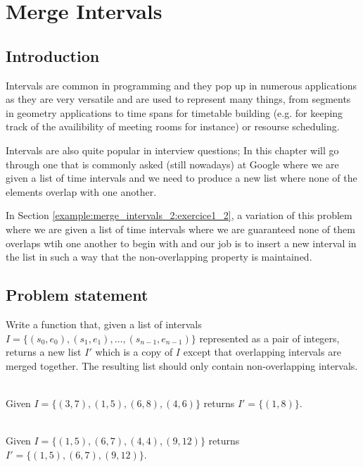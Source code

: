 %



\chapter{Merge Intervals}
\label{ch:merge_intervals_2}
\section*{Introduction}
Intervals are common in programming and they pop up in numerous applications as they are very versatile and are used to represent many things, from segments in geometry applications to time spans for timetable building (e.g. for keeping track of the availibility of meeting rooms for instance) or resourse scheduling.

Intervals are also quite popular in interview questions; In this chapter will go through one that is commonly asked (still nowadays) at Google where we are given a list of time intervals and we need to produce a new list where none of the elements overlap with one another.

In Section \ref{example:merge_intervals_2:exercice1_2}, a variation of this problem where we are given a list of time intervals where we are guaranteed none of them overlaps wtih one another to begin with and our job is to insert a new interval in the list in such a way that the non-overlapping property is maintained.



\section{Problem statement}
\begin{exercise}
\label{example:merge_intervals_2:exercice1_1}
Write a function that, given a list of intervals $I=\{(s_0, e_0),(s_1, e_1), \ldots,(s_{n-1}, e_{n-1})\}$ represented as a pair of integers, returns a new list $I'$ which is a copy of $I$ except that overlapping intervals are merged together. 
The resulting list should only contain non-overlapping intervals.

	\begin{example}
		\label{example:merge_intervals_2:example1_1}
		\hfill \\
		Given $I=\{(3, 7),(1, 5), (6, 8),(4, 6)  \}$ returns $I'=\{(1,8)\}$.
	\end{example}

	\begin{example}
		\label{example:merge_intervals_2:example1_2}
		\hfill \\
		Given $I=\{(1, 5), (6, 7), (4, 4), (9, 12) \}$ returns $I'=\{(1,5),(6,7),(9,12)\}$.
	\end{example}
\end{exercise}

